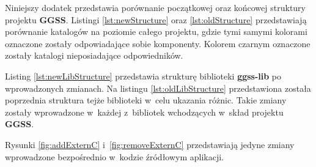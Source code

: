 Niniejszy dodatek przedstawia porównanie początkowej oraz końcowej struktury projektu \textbf{GGSS}. Listingi \ref{lst:newStructure} oraz \ref{lst:oldStructure} przedstawiają porównanie katalogów na poziomie całego projektu, gdzie tymi samymi kolorami oznaczone zostały odpowiadające sobie komponenty. Kolorem czarnym oznaczone zostały katalogi nieposiadające odpowiedników.

Listing \ref{lst:newLibStructure} przedstawia strukturę biblioteki \textbf{ggss-lib} po wprowadzonych zmianach. Na listingu \ref{lst:oldLibStructure} przedstawiona została poprzednia struktura tejże biblioteki w~celu ukazania różnic. Takie zmiany zostały wprowadzone w~każdej z~bibliotek wchodzących w~skład projektu \textbf{GGSS}.

Rysunki \ref{fig:addExternC} i~\ref{fig:removeExternC} przedstawiają jedyne zmiany wprowadzone bezpośrednio w~kodzie źródłowym aplikacji.

\newpage

\twocolumn


\def\redcolor{\color{red}}
\def\blackcolor{\color{black}}
\def\greencolor{\color{green}}
\def\purplecolor{\color{plum(traditional)}}
\def\bluecolor{\color{blue}}
\def\ambercolor{\color{amber(sae/ece)}}
\def\darkgreencolor{\color{cadmiumgreen}}
\def\capricolor{\color{capri}}
\def\magentacolor{\color{magenta}}
\def\sinopiacolor{\color{sinopia}}
\def\yellowcolor{\color{salmon}}
\def\fyellowcolor{\color{fyellow}}

